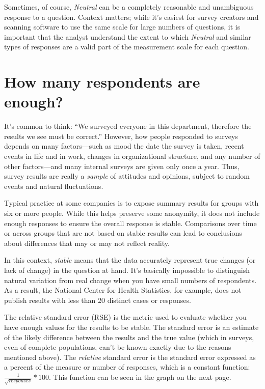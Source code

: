 \documentclass[]{book}
\begin{document}
Sometimes, of course, \emph{Neutral} can be a completely reasonable and
unambiguous response to a question. Context matters; while it's easiest
for survey creators and scanning software to use the same scale for
large numbers of questions, it is important that the analyst understand
the extent to which \emph{Neutral} and similar types of responses are a
valid part of the measurement scale for each question.

\chapter{How many respondents are
enough?}\label{how-many-respondents-are-enough}

It's common to think: ``We surveyed everyone in this department,
therefore the results we see must be correct.'' However, how people
responded to surveys depends on many factors---such as mood the date the
survey is taken, recent events in life and in work, changes in
organizational structure, and any number of other factors---and many
internal surveys are given only once a year. Thus, survey results are
really a \emph{sample} of attitudes and opinions, subject to random
events and natural fluctuations.

Typical practice at some companies is to expose summary results for
groups with six or more people. While this helps preserve some
anonymity, it does not include enough responses to ensure the overall
response is stable. Comparisons over time or across groups that are not
based on stable results can lead to conclusions about differences that
may or may not reflect reality.

In this context, \emph{stable} means that the data accurately represent
true changes (or lack of change) in the question at hand. It's basically
impossible to distinguish natural variation from real change when you
have small numbers of respondents. As a result, the National Center for
Health Statistics, for example, does not publish results with less than
20 distinct cases or responses.

The relative standard error (RSE) is the metric used to evaluate whether
you have enough values for the results to be stable. The standard error
is an estimate of the likely difference between the results and the true
value (which in surveys, even of complete populations, can't be known
exactly due to the reasons mentioned above). The \emph{relative}
standard error is the standard error expressed as a percent of the
measure or number of responses, which is a constant function:
\(\frac{1}{\sqrt{responses}} * 100\). This function can be seen in the
graph on the next page.
\end{document}

